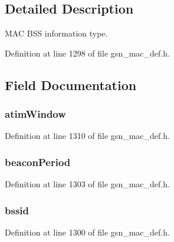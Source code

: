 \subsection{Detailed Description}
MAC BSS information type. 

Definition at line 1298 of file gsn\_\-mac\_\-def.h.



\subsection{Field Documentation}
\hypertarget{a00111_aeb2ce2278c2e879a8988c58d5f7bb606}{
\subsubsection[{atimWindow}]{ {\bf atimWindow}}}
\label{a00111_aeb2ce2278c2e879a8988c58d5f7bb606}


Definition at line 1310 of file gsn\_\-mac\_\-def.h.

\hypertarget{a00111_ad8457bb69452cbc0b2d065ceb377d03d}{
\subsubsection[{beaconPeriod}]{ {\bf beaconPeriod}}}
\label{a00111_ad8457bb69452cbc0b2d065ceb377d03d}


Definition at line 1303 of file gsn\_\-mac\_\-def.h.

\hypertarget{a00111_a0c8072b3bb52f68906a0aacd382de7c2}{
\subsubsection[{bssid}]{ {\bf bssid}}}
\label{a00111_a0c8072b3bb52f68906a0aacd382de7c2}


Definition at line 1300 of file gsn\_\-mac\_\-def.h.

